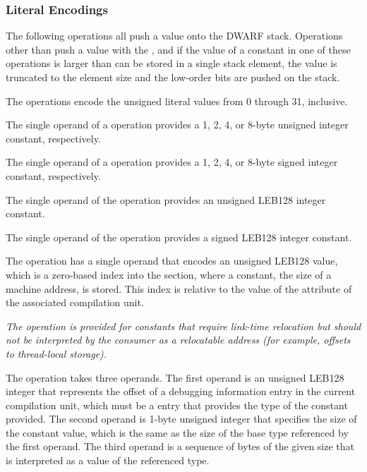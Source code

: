 \subsubsection{Literal Encodings}
\label{chap:literalencodings}
The
following operations all push a value onto the DWARF
stack.
Operations other than \DWOPconsttype{} push a value with the
\generictype, and if the value of a constant in one of these
operations is larger than can be stored in a single stack element,
the value is truncated to the element size and the low-order bits
are pushed on the stack.
\begin{enumerate}[1. ]
\itembfnl{\DWOPlitzeroTARG, \DWOPlitoneTARG, \dots, \DWOPlitthirtyoneTARG}
The \DWOPlitnTARG{} operations encode the unsigned literal values
from 0 through 31, inclusive.

\itembfnl{\DWOPconstoneuTARG, \DWOPconsttwouTARG, \DWOPconstfouruTARG, \DWOPconsteightuTARG}
\DWOPconstnxMARK{}
The single operand of a \DWOPconstnuNAME{} operation provides a 1,
2, 4, or 8-byte unsigned integer constant, respectively.

\itembfnl{\DWOPconstonesTARG, \DWOPconsttwosTARG, \DWOPconstfoursTARG, \DWOPconsteightsTARG}
The single operand of a \DWOPconstnsNAME{} operation provides a 1,
2, 4, or 8-byte signed integer constant, respectively.

\itembfnl{\DWOPconstuTARG}
The single operand of the \DWOPconstuNAME{} operation provides
an unsigned LEB128 integer constant.

\itembfnl{\DWOPconstsTARG}
The single operand of the \DWOPconstsNAME{} operation provides
a signed LEB128 integer constant.

\itembfnl{\DWOPconstxTARG}
The \DWOPconstxNAME{} operation has a single operand that
encodes an unsigned LEB128 value,
which is a zero-based
index into the \dotdebugaddr{} section, where a constant, the
size of a machine address, is stored.
This index is relative to the value of the
\DWATaddrbase{} attribute of the associated compilation unit.

\textit{The \DWOPconstxNAME{} operation is provided for constants that
require link-time relocation but should not be
interpreted by the consumer as a relocatable address
(for example, offsets to thread-local storage).}

\itembfnl{\DWOPconsttypeTARG}
The \DWOPconsttypeNAME{} operation takes three operands. The first operand
is an unsigned LEB128 integer that represents the offset of a debugging
information entry in the current compilation unit, which must be a
\DWTAGbasetype{} entry that provides the type of the constant provided. The
second operand is 1-byte unsigned integer that specifies the size of the
constant value, which is the same as the size of the base type referenced
by the first operand. The third operand is a
sequence of bytes of the given size that is
interpreted as a value of the referenced type.


\end{enumerate}
